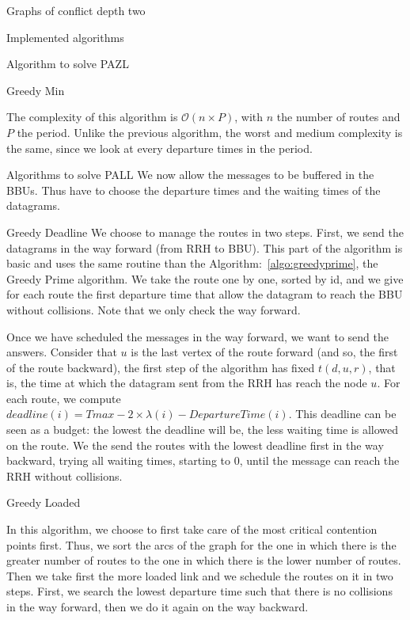 \documentclass[10pt]{article}
\begin{document}
\begin{section}{Graphs of conflict depth two}
\begin{subsection}{Implemented algorithms}
\begin{subsubsection}{Algorithm to solve PAZL }
\begin{paragraph}{Greedy Min}
\begin{algorithm}[H]
\begin{algorithmic}
 	\end{algorithmic}
 	\end{algorithm}
	
	The complexity of this algorithm is $\mathcal{O}(n\times P)$, with $n$ the number of routes and $P$ the period. Unlike the previous algorithm, the worst and medium complexity is the same, since we look at every departure times in the period.
\end{paragraph}
  \end{subsubsection}
    \begin{subsubsection}{Algorithms to solve PALL}
     We now allow the messages to be buffered in the BBUs. Thus have to choose the departure times and the waiting times of the datagrams.     
      \begin{paragraph}{Greedy Deadline}
      We choose to manage the routes in two steps.
      First, we send the datagrams in the way forward (from RRH to BBU).
      This part of the algorithm is basic and uses the same routine than the Algorithm:~\ref{algo:greedyprime}, the Greedy Prime algorithm. We take the route one by one, sorted by id, and we give for each route the first departure time that allow the datagram to reach the BBU without collisions. Note that we only check the way forward.
      
      Once we have scheduled the messages in the way forward, we want to send the answers. Consider that $u$ is the last vertex of the route forward (and so, the first of the route backward), the first step of the algorithm has fixed $t(d,u,r)$, that is, the time at which the datagram sent from the RRH has reach the node $u$. For each route, we compute $deadline(i) = Tmax - 2\times\lambda(i) - DepartureTime(i)$. This deadline can be seen as a budget: the lowest the deadline will be, the less waiting time is allowed on the route.\newline
      We the send the routes with the lowest deadline first in the way backward, trying all waiting times, starting to $0$, until the message can reach the RRH without collisions.
            
        \end{paragraph}

    \begin{paragraph}{Greedy Loaded}

In this algorithm, we choose to first take care of the most critical contention points first. Thus, we sort the arcs of the graph for the one in which there is the greater number of routes to the one in which there is the lower number of routes. Then we take first the more loaded link and we schedule the routes on it in two steps.
First, we search the lowest departure time such that there is no collisions in the way forward, then we do it again on the way backward. 


\end{paragraph}
\end{subsubsection}
\end{subsection}
\end{section}
\end{document}
